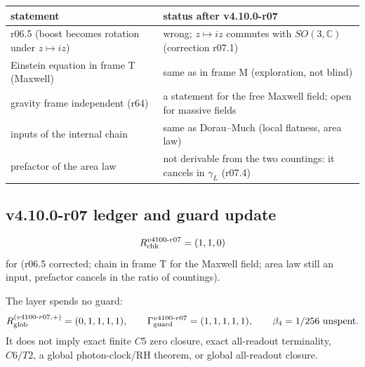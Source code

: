\begin{center}
\small
\begin{tabular}{@{}>{\raggedright\arraybackslash}p{}>{\raggedright\arraybackslash}p{}@{}}
\toprule
statement & status after v4.10.0-r07\\
\midrule
r06.5 (boost becomes rotation under \(z\mapsto iz\)) & wrong; \(z\mapsto iz\) commutes with \(SO(3,\mathbb C)\) (correction r07.1)\\
Einstein equation in frame T (Maxwell) & same as in frame M (exploration, not blind)\\
gravity frame independent (r64) & a statement for the free Maxwell field; open for massive fields\\
inputs of the internal chain & same as Dorau--Much (local flatness, area law)\\
prefactor of the area law & not derivable from the two countings: it cancels in \(\gamma_L\) (r07.4)\\
\bottomrule
\end{tabular}
\end{center}

\subsection*{v4.10.0-r07 ledger and guard update}
\label{subsec:v4100-r07-ledger-guard}

\[
R_{\rm chk}^{v4100\text{-}r07}=(1,1,0)
\]
for (r06.5 corrected; chain in frame T for the Maxwell field; area law still an input, prefactor cancels in the ratio of countings).

The layer spends no guard:
\[
R_{\rm glob}^{(v4100\text{-}r07,+)}=(0,1,1,1,1),
\qquad
\Gamma_{\rm guard}^{v4100\text{-}r07}=(1,1,1,1,1),
\qquad
\beta_4=1/256\ \text{unspent}.
\]
It does not imply exact finite \(C5\) zero closure, exact all-readout terminality,
\(C6/T2\), a global photon-clock/RH theorem, or global all-readout closure.
